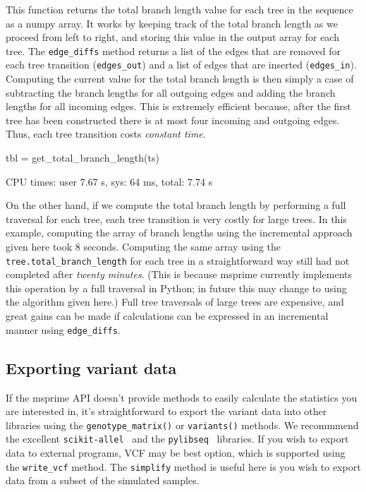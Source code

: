 \documentclass[graybox]{svmult}
\begin{document}
    This function returns the total branch length value for each tree in the
sequence as a numpy array. It works by keeping track of the total branch
length as we proceed from left to right, and storing this value in the
output array for each tree. The \texttt{edge\_diffs} method returns a
list of the edges that are removed for each tree transition
(\texttt{edges\_out}) and a list of edges that are inserted
(\texttt{edges\_in}). Computing the current value for the total branch
length is then simply a case of subtracting the branch lengths for all
outgoing edges and adding the branch lengths for all incoming edges.
This is extremely efficient because, after the first tree has been
constructed there is at most four incoming and outgoing edges. Thus,
each tree transition costs \emph{constant time}.

\begin{pythoncode}
tbl = get_total_branch_length(ts)

CPU times: user 7.67 s, sys: 64 ms, total: 7.74 s
\end{pythoncode}

On the other hand, if we compute the total branch length by performing a
full traversal for each tree, each tree transition is very costly for
large trees. In this example, computing the array of branch lengths
using the incremental approach given here took 8 seconds. Computing the
same array using the \texttt{tree.total\_branch\_length} for each tree
in a straightforward way still had not completed after \emph{twenty
minutes}. (This is because msprime currently implements this operation
by a full traversal in Python; in future this may change to using the
algorithm given here.) Full tree traversals of large trees are
expensive, and great gains can be made if calculations can be expressed
in an incremental manner using \texttt{edge\_diffs}.


\subsection{Exporting variant data}\label{exporting-variant-data}

If the msprime API doesn't provide methods to easily calculate the
statistics you are interested in, it's straightforward to export the
variant data into other libraries using the \texttt{genotype\_matrix()}
or \texttt{variants()} methods. We recommmend the excellent
\texttt{scikit-allel}~\citep{miles2017scikit} and
the \texttt{pylibseq}~\citep{thornton2003libsequence} libraries.
If you wish to export data to
external programs, VCF may be best option, which is supported using the
\texttt{write\_vcf} method. The \texttt{simplify} method is useful here
is you wish to export data from a subset of the simulated samples.
\end{document}
